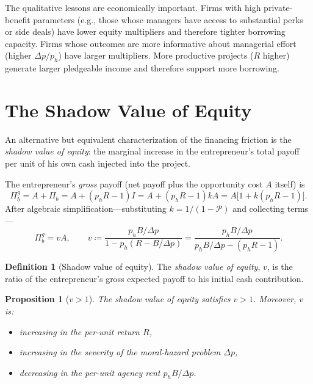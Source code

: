 \documentclass[11pt,a4paper,oneside]{book}
\theoremstyle{plain}
\newtheorem{proposition}[theorem]{Proposition}
\theoremstyle{definition}
\newtheorem{definition}[theorem]{Definition}
\theoremstyle{remark}
\numberwithin{equation}{chapter}
\begin{document}
The qualitative lessons are economically important.
Firms with high private-benefit parameters (e.g., those whose managers have access to substantial perks or side deals) have lower equity multipliers and therefore tighter borrowing capacity.
Firms whose outcomes are more informative about managerial effort (higher $\Delta p / p_h$) have larger multipliers.
More productive projects ($R$ higher) generate larger pledgeable income and therefore support more borrowing.

\section{The Shadow Value of Equity}
\label{sec:EM-shadow-value}

An alternative but equivalent characterization of the financing friction is the \emph{shadow value of equity}: the marginal increase in the entrepreneur's total payoff per unit of his own cash injected into the project.

The entrepreneur's \emph{gross} payoff (net payoff plus the opportunity cost $A$ itself) is
\begin{equation}\label{eq:EM-gross-payoff}
  \Pi_b^g = A + \Pi_b = A + (p_h R - 1) I = A + (p_h R - 1) k A = A \bigl[ 1 + k(p_h R - 1) \bigr].
\end{equation}
After algebraic simplification---substituting $k = 1/(1 - \mathcal{P})$ and collecting terms---
\begin{equation}\label{eq:EM-v}
  \Pi_b^g = v A, \qquad v \coloneqq \frac{p_h B/\Delta p}{1 - p_h(R - B/\Delta p)} = \frac{p_h B/\Delta p}{p_h B/\Delta p - (p_h R - 1)}.
\end{equation}

\begin{definition}[Shadow value of equity]\label{def:v}
The \emph{shadow value of equity}, $v$, is the ratio of the entrepreneur's gross expected payoff to his initial cash contribution.
\end{definition}

\begin{proposition}[$v > 1$]\label{prop:EM-v-bigger-1}
The shadow value of equity satisfies $v > 1$.
Moreover, $v$ is:
\begin{itemize}
  \item \emph{increasing} in the per-unit return $R$,
  \item \emph{increasing} in the severity of the moral-hazard problem $\Delta p$,
  \item \emph{decreasing} in the per-unit agency rent $p_h B / \Delta p$.
\end{itemize}
\end{proposition}
\end{document}
